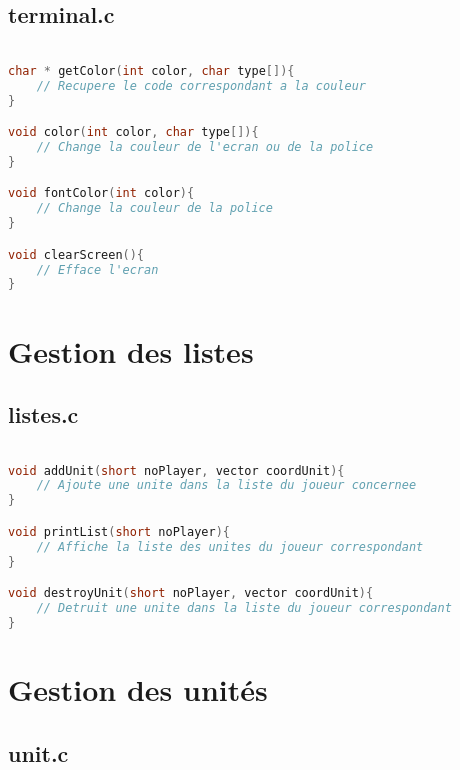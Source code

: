 \documentclass[a4paper,10pt]{extreport}
\begin{document}
\chapter{terminal.c}
\vspace{-1cm}

\begin{lstlisting}[language=c]

char * getColor(int color, char type[]){
	// Recupere le code correspondant a la couleur
}

void color(int color, char type[]){
	// Change la couleur de l'ecran ou de la police
}

void fontColor(int color){
	// Change la couleur de la police
}

void clearScreen(){
	// Efface l'ecran
}

\end{lstlisting}

\part{Gestion des listes}

\chapter{listes.c}
\vspace{-1cm}

\begin{lstlisting}[language=c]

void addUnit(short noPlayer, vector coordUnit){
	// Ajoute une unite dans la liste du joueur concernee
}

void printList(short noPlayer){
	// Affiche la liste des unites du joueur correspondant
}

void destroyUnit(short noPlayer, vector coordUnit){
	// Detruit une unite dans la liste du joueur correspondant
}

\end{lstlisting}

\part{Gestion des unités}

\chapter{unit.c}
\vspace{-1cm}
\end{document}
